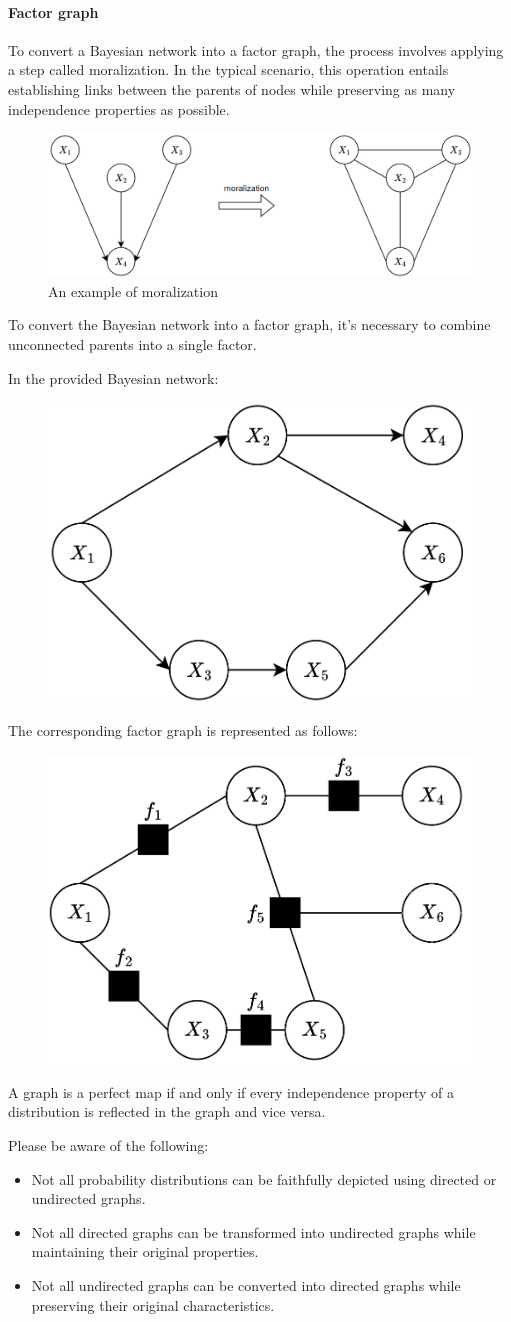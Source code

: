 \paragraph*{Factor graph}
To convert a Bayesian network into a factor graph, the process involves applying a step called moralization. 
In the typical scenario, this operation entails establishing links between the parents of nodes while preserving as many independence properties as possible.
\begin{figure}[H]
    \centering
    \includegraphics[width=0.6\linewidth]{images/mor.png}
    \caption{An example of moralization}
\end{figure}
To convert the Bayesian network into a factor graph, it's necessary to combine unconnected parents into a single factor.
\begin{example}
    In the provided Bayesian network:
    \begin{figure}[H]
        \centering
        \includegraphics[width=0.25\linewidth]{images/bn.png}
    \end{figure}
    The corresponding factor graph is represented as follows:
    \begin{figure}[H]
        \centering
        \includegraphics[width=0.25\linewidth]{images/bnf.png}
    \end{figure}
\end{example}
\begin{definition}
    A graph is a perfect map if and only if every independence property of a distribution is reflected in the graph and vice versa. 
\end{definition}
Please be aware of the following:
\begin{itemize}
    \item Not all probability distributions can be faithfully depicted using directed or undirected graphs.
    \item Not all directed graphs can be transformed into undirected graphs while maintaining their original properties.
    \item Not all undirected graphs can be converted into directed graphs while preserving their original characteristics.
\end{itemize}
